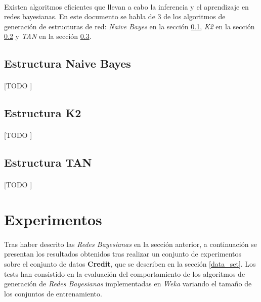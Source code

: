 \documentclass{article}
\begin{document}
		\paragraph{}
		Existen algoritmos eficientes que llevan a cabo la inferencia y el aprendizaje en redes bayesianas. En este documento se habla de 3 de los algoritmos de generación de estructuras de red: \emph{Naive Bayes} en la sección \ref{sec:structure_naive}, \emph{K2} en la sección \ref{sec:structure_K2} y \emph{TAN} en la sección \ref{sec:structure_tan}.

		\subsection{Estructura Naive Bayes}
		\label{sec:structure_naive}

			\paragraph{}
			[TODO ]

		\subsection{Estructura K2}
		\label{sec:structure_K2}

			\paragraph{}
			[TODO ]

		\subsection{Estructura TAN}
		\label{sec:structure_tan}

			\paragraph{}
			[TODO ]

	\section{Experimentos}
	\label{sec:experiments}

		\paragraph{}
		Tras haber descrito las \emph{Redes Bayesianas} en la sección anterior, a continuación se presentan los resultados obtenidos tras realizar un conjunto de experimentos sobre el conjunto de datos \textbf{Credit}, que se describen en la sección \ref{data_set}. Los tests han consistido en la evaluación del comportamiento de los algoritmos de generación de \emph{Redes Bayesianas} implementadas en \emph{Weka} \cite{tool:weka} variando el tamaño de los conjuntos de entrenamiento.
\end{document}
